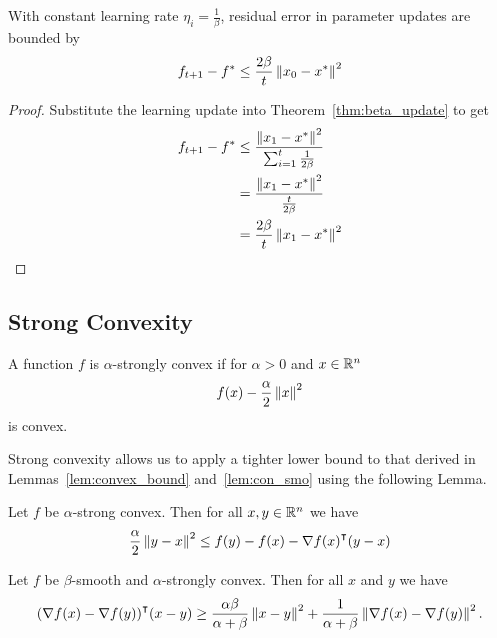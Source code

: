 \begin{corollary}
    With constant learning rate $\eta_i = \frac{1}{\beta}$, residual error in
    parameter updates are bounded by
    \begin{equation}
        f_{t+1} - f^* \leq \frac{2\beta}{t} \left\| x_0 - x^* \right\|^2
    \end{equation}
\end{corollary}

\begin{proof}
    Substitute the learning update into Theorem~\ref{thm:beta_update} to get 
    \begin{equation}
        \begin{aligned}
            f_{t + 1} - f^* &\leq \frac{\left\| x_1 - x^* \right\|^2}{\sum^{t}_{i=1} \frac{1}{2\beta}} \\
            &= \frac{\left\| x_1 - x^* \right\|^2}{\frac{t}{2\beta}} \\
            &= \frac{2\beta}{t}  \left\| x_1 - x^* \right\|^2
        \end{aligned}
    \end{equation}
\end{proof}


\subsection{Strong Convexity}

\begin{definition}
    A function $f$ is $\alpha$-strongly convex if for $\alpha > 0$ and $x \in
    \mathbb R^n$
    \begin{equation}
        f(x) - \frac{\alpha}{2}\left\| x \right\|^2   
    \end{equation}
    is convex.
\end{definition}

Strong convexity allows us to apply a tighter lower bound to that derived in
Lemmas~\ref{lem:convex_bound} and~\ref{lem:con_smo} using the following Lemma.

\begin{lemma}
    Let $f$ be $\alpha$-strong convex. Then for all $x, y \in \mathbb R^n$ we have 
    \begin{equation}
\frac{\alpha}{2}
        \left\| y - x \right\|^2
        \leq f(y) - f(x) - \nabla {f(x)}^\intercal(y - x)     \end{equation}
\end{lemma}

\begin{lemma}
    Let $f$ be $\beta$-smooth and $\alpha$-strongly convex. Then for all $x$ and
    $y$ we have
    \begin{equation}
        {(\nabla f(x) - \nabla f(y))}^\intercal (x - y) \geq
        \frac{\alpha\beta}{\alpha + \beta} \left\| x - y \right\|^2 + \frac{1}{\alpha +
        \beta} \left\| \nabla f(x) - \nabla f(y) \right\|^2.
    \end{equation}
\end{lemma}

